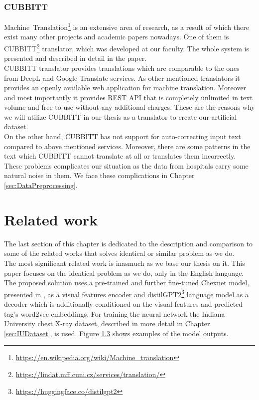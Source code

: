 \subsubsection{CUBBITT}
\label{sec:Cubbitt}
Machine~Translation\footnote[17]{\url{https://en.wikipedia.org/wiki/Machine\_translation}} is an extensive area of research, as a result of which there exist many other projects and academic papers nowadays. One of them is CUBBITT\footnote[18]{\url{https://lindat.mff.cuni.cz/services/translation/}} translator, which was developed at our faculty. The whole system is presented and described in detail in the \citet{biblio:PoToTransformingmachine2020} paper. \\

CUBBITT translator provides translations which are comparable to the ones from DeepL and Google Translate services. As other mentioned translators it provides an openly available web application for machine translation. Moreover and most importantly it provides REST API that is completely unlimited in text volume and free to use without any additional charges. These are the reasons why we will utilize CUBBITT in our thesis as a translator to create our artificial dataset.\\

On the other hand, CUBBITT has not support for auto-correcting input text compared to above mentioned services. Moreover, there are some patterns in the text which CUBBITT cannot translate at all or translates them incorrectly. These problems complicates our situation as the data from hospitals carry some natural noise in them. We face these complications in Chapter \ref{sec:DataPreprocessing}.

\section{Related work}
\label{sec:RelatedWork}
The last section of this chapter is dedicated to the description and comparison to some of the related works that solves identical or similar problem as we do.\\

The most significant related work is \citet{alfarghaly2021automated} inasmuch as we base our thesis on it. This paper focuses on the identical problem as we do, only in the English language. The proposed solution uses a pre-trained and further fine-tuned Chexnet model, presented in \citet{rajpurkar2017chexnet}, as a visual features encoder and distilGPT2\footnote[19]{\url{https://huggingface.co/distilgpt2}} language model\citep{sanh2019distilbert} as a decoder which is additionally conditioned on the visual features and predicted tag's word2vec\citep{mikolov2013distributed} embeddings. For training the neural network the Indiana University chest X-ray dataset, described in more detail in Chapter \ref{sec:IUDataset}, is used. Figure \hyperref[fig03:OmarExample]{1.3} shows examples of the model outputs.\\

